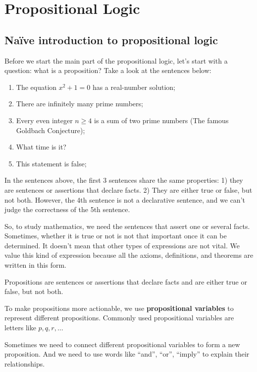 \documentclass[oneside]{book}
\begin{document}
\section{Propositional Logic}

\subsection{Naïve introduction to propositional logic}
Before we start the main part of the propositional logic, let’s start with a question: what is a proposition? Take a look at the sentences below:
\begin{enumerate}
    \item The equation $x^2+1=0$ has a real-number solution;
    \item There are infinitely many prime numbers;
    \item Every even integer $n \ge 4$ is a sum of two prime numbers (The famous Goldbach Conjecture);
    \item What time is it?
    \item This statement is false;
\end{enumerate}
In the sentences above, the first 3 sentences share the same properties: 1) they are sentences or assertions that declare facts. 2) They are either true or false, but not both. However, the 4th sentence is not a declarative sentence, and we can’t judge the correctness of the 5th sentence.

So, to study mathematics, we need the sentences that assert one or several facts. Sometimes, whether it is true or not is not that important once it can be determined. It doesn’t mean that other types of expressions are not vital. We value this kind of expression because all the axioms, definitions, and theorems are written in this form.

\begin{definition}[Proposition]
Propositions are sentences or assertions that declare facts and are either true or false, but not both.
\end{definition}

To make propositions more actionable, we use \textbf{propositional variables} to represent different propositions. Commonly used propositional variables are letters like $p, q, r, \dots$

Sometimes we need to connect different propositional variables to form a new proposition. And we need to use words like “and”, “or”, “imply” to explain their relationships.
\end{document}
